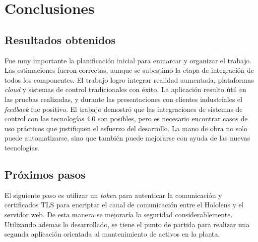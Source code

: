 
\chapter{Conclusiones} %

\label{Chapter5} %




\section{Resultados obtenidos}

Fue muy importante la planificación inicial para enmarcar y organizar el trabajo. Las estimaciones fueron correctas, aunque se subestimo la etapa de integración de todos los componentes. El trabajo logro integrar realidad aumentada, plataformas \textit{cloud} y sistemas de control tradicionales con éxito. La aplicación resulto útil en las pruebas realizadas, y durante las presentaciones con clientes industriales el \textit{feedback} fue positivo. El trabajo demostró que las integraciones de sistemas de control con las tecnologías 4.0 son posibles, pero es necesario encontrar casos de uso prácticos que justifiquen el esfuerzo del desarrollo. La mano de obra no solo puede automatizarse, sino que también puede mejorarse con ayuda de las nuevas tecnologías.

\section{Próximos pasos}

El siguiente paso es utilizar un \textit{token} para autenticar la comunicación y certificados TLS  para encriptar el canal de comunicación entre el Hololens y el servidor web. De esta manera se mejoraría la seguridad considerablemente. Utilizando ademas lo desarrollado, se tiene el punto de partida para realizar una segunda aplicación orientada al mantenimiento de activos en la planta.
